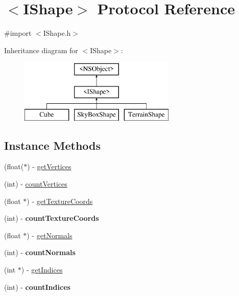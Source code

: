 \hypertarget{protocol_i_shape-p}{}\section{$<$I\+Shape$>$ Protocol Reference}
\label{protocol_i_shape-p}


{\ttfamily \#import $<$I\+Shape.\+h$>$}

Inheritance diagram for $<$I\+Shape$>$\+:\begin{figure}[H]
\begin{center}
\leavevmode
\includegraphics[height=3.000000cm]{protocol_i_shape-p}
\end{center}
\end{figure}
\subsection*{Instance Methods}
\begin{DoxyCompactItemize}
\item 
(float($\ast$) -\/ \hyperlink{protocol_i_shape-p_a0d22f432f5a46500a7264f71cc6c1aa0}{get\+Vertices}
\item 
(int) -\/ \hyperlink{protocol_i_shape-p_ac0953f79b242f614b8d0d4bbee7c78ec}{count\+Vertices}
\item 
(float $\ast$) -\/ \hyperlink{protocol_i_shape-p_a0dfdefe0e8402efcdaac08542b4e2657}{get\+Texture\+Coords}
\item 
(int) -\/ {\bfseries count\+Texture\+Coords}\hypertarget{protocol_i_shape-p_a67a5bb73ff327adf2867882e0a14415a}{}\label{protocol_i_shape-p_a67a5bb73ff327adf2867882e0a14415a}

\item 
(float $\ast$) -\/ \hyperlink{protocol_i_shape-p_a26b9453056e6fdceae7f413ce5648035}{get\+Normals}
\item 
(int) -\/ {\bfseries count\+Normals}\hypertarget{protocol_i_shape-p_ae4466484cab2e1d256ec4de865459376}{}\label{protocol_i_shape-p_ae4466484cab2e1d256ec4de865459376}

\item 
(int $\ast$) -\/ \hyperlink{protocol_i_shape-p_a514418ae840ad3711ea8f99962ec9974}{get\+Indices}
\item 
(int) -\/ {\bfseries count\+Indices}\hypertarget{protocol_i_shape-p_a3154097fa193edfd42625f3286c24321}{}\label{protocol_i_shape-p_a3154097fa193edfd42625f3286c24321}

\end{DoxyCompactItemize}


